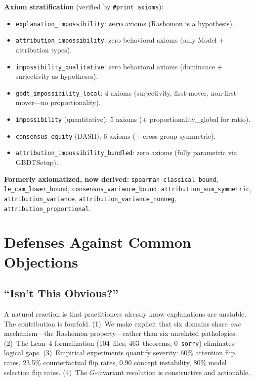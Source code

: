 \documentclass{article}
\begin{document}
\textbf{Axiom stratification} (verified by \texttt{\#print axioms}):
\begin{itemize}
  \item \texttt{explanation\_impossibility}: \textbf{zero} axioms (Rashomon is a hypothesis).
  \item \texttt{attribution\_impossibility}: zero behavioral axioms (only Model + attribution types).
  \item \texttt{impossibility\_qualitative}: zero behavioral axioms (dominance + surjectivity as hypotheses).
  \item \texttt{gbdt\_impossibility\_local}: 4 axioms (surjectivity, first-mover, non-first-mover---no proportionality).
  \item \texttt{impossibility} (quantitative): 5 axioms (+ proportionality\_global for ratio).
  \item \texttt{consensus\_equity} (DASH): 6 axioms (+ cross-group symmetric).
  \item \texttt{attribution\_impossibility\_bundled}: zero axioms (fully parametric via GBDTSetup).
\end{itemize}

\textbf{Formerly axiomatized, now derived:}
\texttt{spearman\_classical\_bound}, \texttt{le\_cam\_lower\_bound}, \texttt{consensus\_variance\_bound}, \texttt{attribution\_sum\_symmetric}, \texttt{attribution\_variance}, \texttt{attribution\_variance\_nonneg}, \texttt{attribution\_proportional}.

\section{Defenses Against Common Objections}
\label{sec:defenses}

\subsection{``Isn't This Obvious?''}

A natural reaction is that practitioners already know explanations are unstable.  The contribution is fourfold.
(1)~We make explicit that six domains share \emph{one} mechanism---the Rashomon property---rather than six unrelated pathologies.
(2)~The Lean~4 formalization (104~files, 463~theorems, 0~\texttt{sorry}) eliminates logical gaps.
(3)~Empirical experiments quantify severity: 60\% attention flip rates, 23.5\% counterfactual flip rates, 0.90 concept instability, 80\% model selection flip rates.
(4)~The $G$-invariant resolution is constructive and actionable.
\end{document}
